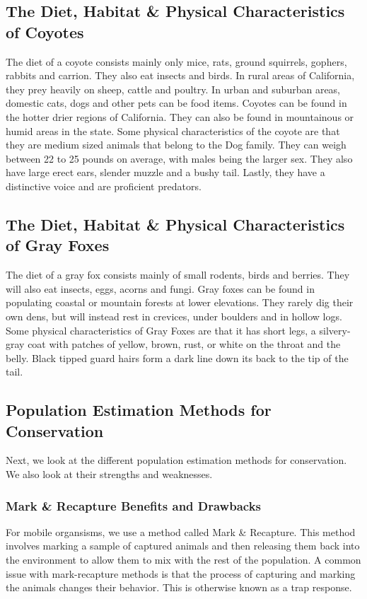 \documentclass[a4paper]{article}
\begin{document}
\subsection{The Diet, Habitat \& Physical Characteristics of Coyotes}
The diet of a coyote consists mainly only mice, rats, ground squirrels, gophers, rabbits and carrion. They also eat insects and birds. In rural areas of
California, they prey heavily on sheep, cattle and poultry. In urban and suburban areas, domestic cats, dogs and other pets can be food items. Coyotes can
be found in the hotter drier regions of California. They can also be found in mountainous or humid areas in the state. Some physical characteristics of the 
coyote are that they are medium sized animals that belong to the Dog family. They can weigh between 22 to 25 pounds on average, with males being the larger
sex. They also have large erect ears, slender muzzle and a bushy tail. Lastly, they have a distinctive voice and are proficient predators.

\subsection{The Diet, Habitat \& Physical Characteristics of Gray Foxes}
The diet of a gray fox consists mainly of small rodents, birds and berries. They will also eat insects, eggs, acorns and fungi. Gray foxes can be found in
populating coastal or mountain forests at lower elevations. They rarely dig their own dens, but will instead rest in crevices, under boulders and in hollow
logs. Some physical characteristics of Gray Foxes are that it has short legs, a silvery-gray coat with patches of yellow, brown, rust, or white on the 
throat and the belly. Black tipped guard hairs form a dark line down its back to the tip of the tail.

\newpage

\subsection{Population Estimation Methods for Conservation}
Next, we look at the different population estimation methods for conservation. We also look at their strengths and weaknesses. 

\subsubsection{Mark \& Recapture Benefits and Drawbacks}
For mobile organsisms, we use a method called Mark \& Recapture. This method involves marking a sample of captured animals and then releasing them back into 
the environment to allow them to mix with the rest of the population. A common issue with mark-recapture methods is that the process of capturing and marking
the animals changes their behavior. This is otherwise known as a trap response.
\end{document}
